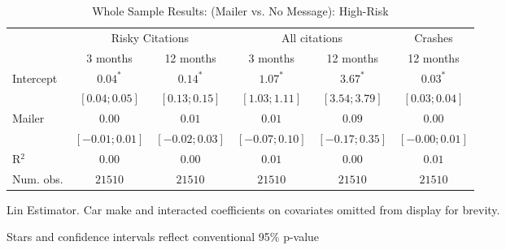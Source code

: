 
\begin{table}
\caption{Whole Sample Results: (Mailer vs. No Message): High-Risk}
\begin{center}
\begin{threeparttable}
\begin{tabular}{l c c c c c}
\hline
 & \multicolumn{2}{c}{Risky Citations} & \multicolumn{2}{c}{All citations} & \multicolumn{1}{c}{Crashes} \\
\cline{2-3} \cline{4-5} \cline{6-6}
 & 3 months & 12 months & 3 months & 12 months & 12 months \\
\hline
Intercept & $0.04^{*}$       & $0.14^{*}$       & $1.07^{*}$       & $3.67^{*}$       & $0.03^{*}$       \\
          & $ [ 0.04; 0.05]$ & $ [ 0.13; 0.15]$ & $ [ 1.03; 1.11]$ & $ [ 3.54; 3.79]$ & $ [ 0.03; 0.04]$ \\
Mailer    & $0.00$           & $0.01$           & $0.01$           & $0.09$           & $0.00$           \\
          & $ [-0.01; 0.01]$ & $ [-0.02; 0.03]$ & $ [-0.07; 0.10]$ & $ [-0.17; 0.35]$ & $ [-0.00; 0.01]$ \\
\hline
R$^2$     & $0.00$           & $0.00$           & $0.01$           & $0.00$           & $0.01$           \\
Num. obs. & $21510$          & $21510$          & $21510$          & $21510$          & $21510$          \\
\hline
\end{tabular}
\begin{tablenotes}[flushleft]
\scriptsize{\item Lin Estimator. Car make and interacted coefficients on covariates omitted from display for brevity.
                             \item Stars and confidence intervals reflect conventional 95\% p-value}
\end{tablenotes}
\end{threeparttable}
\label{table:coefficients}
\end{center}
\end{table}
